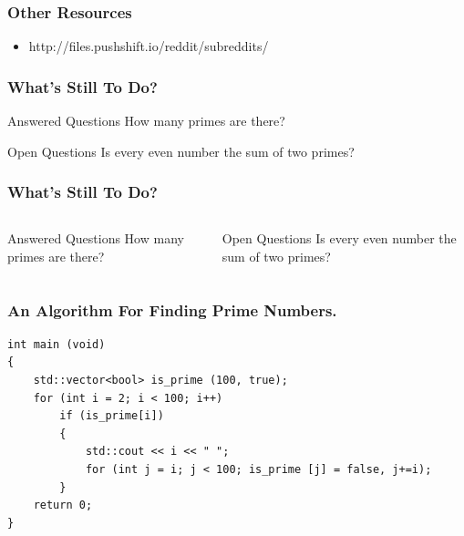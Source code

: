 \documentclass{beamer}
\begin{document}
\begin{frame}
\frametitle{Other Resources}
\begin{itemize}
    \item http://files.pushshift.io/reddit/subreddits/
\end{itemize}
\end{frame}

\begin{frame}
\frametitle{What’s Still To Do?}
\begin{block}{Answered Questions}
    How many primes are there?
\end{block}
\begin{block}{Open Questions}
    Is every even number the sum of two primes?
\end{block}
\end{frame}

\begin{frame}
\frametitle{What’s Still To Do?}
\begin{columns}
    \begin{block}{Answered Questions}
        How many primes are there?
    \end{block}
    \begin{block}{Open Questions}
        Is every even number the sum of two primes?
    \end{block}
\end{columns}
\end{frame}

\begin{frame}[fragile]
\frametitle{An Algorithm For Finding Prime Numbers.}
\begin{verbatim}
int main (void)
{
    std::vector<bool> is_prime (100, true);
    for (int i = 2; i < 100; i++)
        if (is_prime[i])
        {
            std::cout << i << " ";
            for (int j = i; j < 100; is_prime [j] = false, j+=i);
        }
    return 0;
}
\end{verbatim}
\end{frame}
\end{document}

